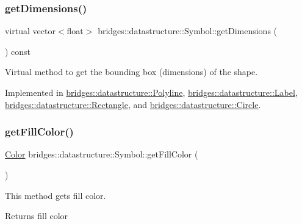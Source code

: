 \subsubsection{\texorpdfstring{get\+Dimensions()}{getDimensions()}}
{\footnotesize\ttfamily virtual vector$<$float$>$ bridges\+::datastructure\+::\+Symbol\+::get\+Dimensions (\begin{DoxyParamCaption}{ }\end{DoxyParamCaption}) const\hspace{0.3cm}{\ttfamily [pure virtual]}}



Virtual method to get the bounding box (dimensions) of the shape. 



Implemented in \hyperlink{classbridges_1_1datastructure_1_1_polyline_aefa5c986d003c9bde234e230a6bd8bd8}{bridges\+::datastructure\+::\+Polyline}, \hyperlink{classbridges_1_1datastructure_1_1_label_a39f904db9e21e038aa4c7cb274f657a5}{bridges\+::datastructure\+::\+Label}, \hyperlink{classbridges_1_1datastructure_1_1_rectangle_a60e75bd0d064c63a726134cd5ca0b827}{bridges\+::datastructure\+::\+Rectangle}, and \hyperlink{classbridges_1_1datastructure_1_1_circle_ae70d478b0901e4c492eff1be4f01c33c}{bridges\+::datastructure\+::\+Circle}.

\mbox{\label{classbridges_1_1datastructure_1_1_symbol_a4b29601e24832077a15321af5c71cfdf}} 
\subsubsection{\texorpdfstring{get\+Fill\+Color()}{getFillColor()}}
{\footnotesize\ttfamily \hyperlink{classbridges_1_1datastructure_1_1_color}{Color} bridges\+::datastructure\+::\+Symbol\+::get\+Fill\+Color (\begin{DoxyParamCaption}{ }\end{DoxyParamCaption})\hspace{0.3cm}{\ttfamily [inline]}}



This method gets fill color. 

\begin{DoxyReturn}{Returns}
fill color 
\end{DoxyReturn}
\mbox{\label{classbridges_1_1datastructure_1_1_symbol_ac4b6cfcf91217d66ed0694080846970f}} 
